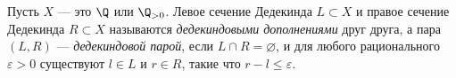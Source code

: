\documentclass[
	extrafontsizes,
	11pt,
	hyphens,
]{memoir}
\begin{document}
\begin{definition}
Пусть \(X\) --- это \(\Q\) или \(\Q_{>0}\).
Левое сечение Дедекинда \(L \subset X\) и правое сечение Дедекинда \(R \subset X\) называются \emph{дедекиндовыми дополнениями} друг друга, а пара \((L,R)\) --- \emph{дедекиндовой парой}, если \(L \cap R = \varnothing\), и для любого рационального \(\varepsilon > 0\) существуют \(l \in L\) и \(r \in R\), такие что \(r - l \leq \varepsilon\).
\end{definition}

\end{document}
